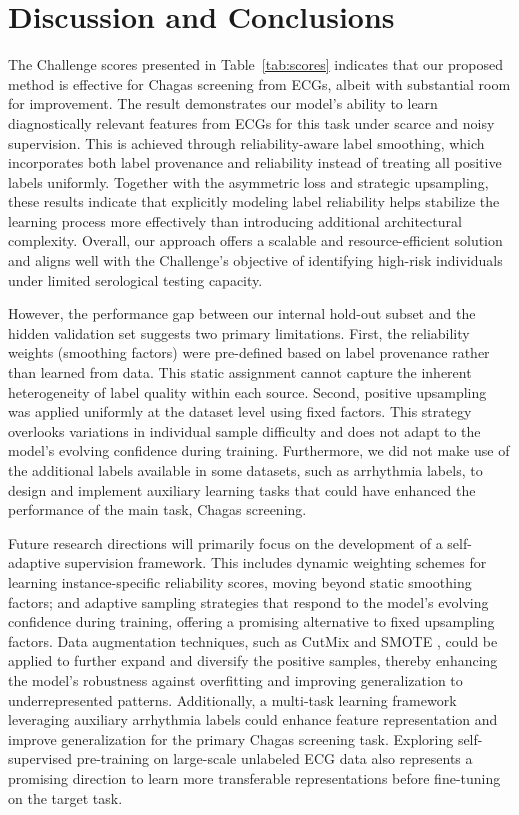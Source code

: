 \section{Discussion and Conclusions}
\label{sec:discu}


The Challenge scores presented in Table~\ref{tab:scores} indicates that our proposed method is effective for Chagas screening from ECGs, albeit with substantial room for improvement. The result demonstrates our model's ability to learn diagnostically relevant features from ECGs for this task under scarce and noisy supervision. This is achieved through reliability-aware label smoothing, which incorporates both label provenance and reliability instead of treating all positive labels uniformly. Together with the asymmetric loss and strategic upsampling, these results indicate that explicitly modeling label reliability helps stabilize the learning process more effectively than introducing additional architectural complexity. Overall, our approach offers a scalable and resource-efficient solution and aligns well with the Challenge's objective of identifying high-risk individuals under limited serological testing capacity.

However, the performance gap between our internal hold-out subset and the hidden validation set suggests two primary limitations. First, the reliability weights (smoothing factors) were pre-defined based on label provenance rather than learned from data. This static assignment cannot capture the inherent heterogeneity of label quality within each source. Second, positive upsampling was applied uniformly at the dataset level using fixed factors. This strategy overlooks variations in individual sample difficulty and does not adapt to the model's evolving confidence during training. Furthermore, we did not make use of the additional labels available in some datasets, such as arrhythmia labels, to design and implement auxiliary learning tasks that could have enhanced the performance of the main task, Chagas screening.

Future research directions will primarily focus on the development of a self-adaptive supervision framework. This includes dynamic weighting schemes for learning instance-specific reliability scores, moving beyond static smoothing factors; and adaptive sampling strategies that respond to the model's evolving confidence during training, offering a promising alternative to fixed upsampling factors. Data augmentation techniques, such as CutMix \cite{yun2019cutmix} and SMOTE \cite{Chawla_2002_SMOTE}, could be applied to further expand and diversify the positive samples, thereby enhancing the model's robustness against overfitting and improving generalization to underrepresented patterns. Additionally, a multi-task learning framework leveraging auxiliary arrhythmia labels could enhance feature representation and improve generalization for the primary Chagas screening task. Exploring self-supervised pre-training on large-scale unlabeled ECG data also represents a promising direction to learn more transferable representations before fine-tuning on the target task.
